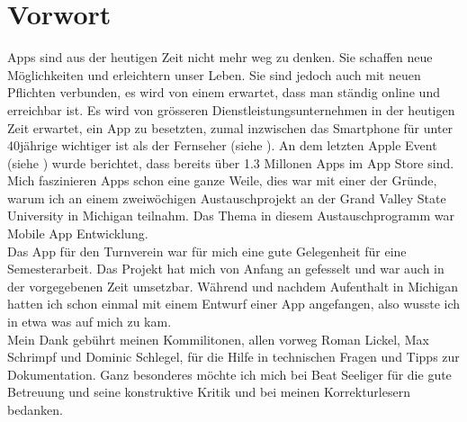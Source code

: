 \chapter*{Vorwort}\label{vorwort}
Apps sind aus der heutigen Zeit nicht mehr weg zu denken. Sie schaffen neue Möglichkeiten und erleichtern unser Leben. Sie sind jedoch auch mit neuen Pflichten verbunden, es wird von einem erwartet, dass man ständig online und erreichbar ist. Es wird von grösseren Dienstleistungsunternehmen in der heutigen Zeit erwartet, ein App zu besetzten, zumal inzwischen das Smartphone für unter 40jährige wichtiger ist als der Fernseher (siehe \cite{digitalisierungsbericht2014}). An dem letzten Apple Event (siehe \cite{apple_event_sept_2014}) wurde berichtet, dass bereits über 1.3 Millonen Apps im App Store sind. Mich faszinieren Apps schon eine ganze Weile, dies war mit einer der Gründe, warum ich an einem zweiwöchigen Austauschprojekt an der Grand Valley State University in Michigan teilnahm. Das Thema in diesem Austauschprogramm war Mobile App Entwicklung.\\

Das App für den Turnverein war für mich eine gute Gelegenheit für eine Semesterarbeit. Das Projekt hat mich von Anfang an gefesselt und war auch in der vorgegebenen Zeit umsetzbar. Während und nachdem Aufenthalt in Michigan hatten ich schon einmal mit einem Entwurf einer App angefangen, also wusste ich in etwa was auf mich zu kam.\\

Mein Dank gebührt meinen Kommilitonen, allen vorweg Roman Lickel, Max Schrimpf und Dominic Schlegel, für die Hilfe in technischen Fragen und Tipps zur Dokumentation. Ganz besonderes möchte ich mich bei Beat Seeliger für die gute Betreuung und seine konstruktive Kritik und bei meinen Korrekturlesern bedanken.